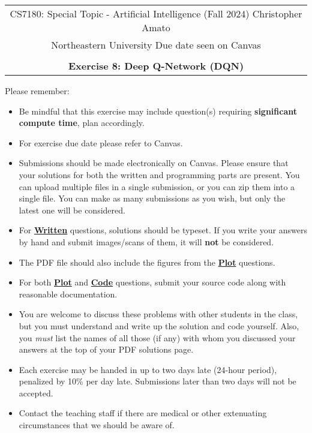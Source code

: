 \documentclass{article}
\begin{document}
\begin{center}
	\begin{tabular}{|c|}
		\hline
		CS7180: Special Topic - Artificial Intelligence (Fall 2024) \hspace{1cm} Christopher Amato \\
		Northeastern University      \hfill   Due date seen on Canvas           \\\\
		{\bfseries \large Exercise 8: Deep Q-Network (DQN)}                                    \\ \hline
	\end{tabular}
\end{center}


Please remember:
\begin{itemize}
	\item Be mindful that this exercise may include question(s) requiring \textbf{significant compute time}, plan accordingly. 
	\item For exercise due date please refer to Canvas.
	\item Submissions should be made electronically on Canvas. Please ensure that your solutions for both the written and programming parts are present. You can upload multiple files in a single submission, or you can zip them into a single file. You can make as many submissions as you wish, but only the latest one will be considered.
	\item For \uline{\textbf{Written}} questions, solutions should be typeset. If you write your answers by hand and submit images/scans of them, it will \textbf{not} be considered.
	\item The PDF file should also include the figures from the \uline{\textbf{Plot}} questions.
	\item For both \uline{\textbf{Plot}} and \uline{\textbf{Code}} questions, submit your source code along with reasonable documentation.
	\item You are welcome to discuss these problems with other students in the class, but you must understand and write up the solution and code yourself. Also, you \textit{must} list the names of all those (if any) with whom you discussed your answers at the top of your PDF solutions page.
	\item Each exercise may be handed in up to two days late (24-hour period), penalized by 10\% per day late. Submissions later than two days will not be accepted.
	\item Contact the teaching staff if there are medical or other extenuating circumstances that we should be aware of.
\end{itemize}
\end{document}
